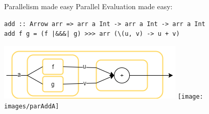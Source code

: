 \begin{frame}[fragile]{Parallelism made easy}
Parallel Evaluation made easy:
\begin{lstlisting}[frame=htrbl]
add :: Arrow arr => arr a Int -> arr a Int -> arr a Int
add f g = (f |&&&| g) >>> arr (\(u, v) -> u + v)
\end{lstlisting}
\begin{center}
	\includegraphics[scale=0.6]{images/addA-comb}
	\hspace{2em}
	\texttt{[image: images/parAddA]}
\end{center}
\end{frame}